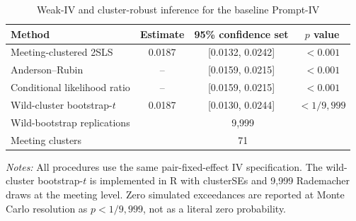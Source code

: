 \begin{table}[htbp]
\color{revisionred}
\centering
\begin{threeparttable}
\caption{Weak-IV and cluster-robust inference for the baseline Prompt-IV}
\label{tab:inference-completion}
\begin{footnotesize}
\begin{tabular}{lccc}
\toprule
Method & Estimate & 95\% confidence set & $p$ value \\
\midrule
Meeting-clustered 2SLS & 0.0187 & [0.0132, 0.0242] & $<0.001$ \\
Anderson--Rubin & -- & [0.0159, 0.0215] & $<0.001$ \\
Conditional likelihood ratio & -- & [0.0159, 0.0215] & $<0.001$ \\
Wild-cluster bootstrap-$t$ & 0.0187 & [0.0130, 0.0244] & $<1/9{,}999$ \\
\midrule
Wild-bootstrap replications & \multicolumn{3}{c}{9,999} \\
Meeting clusters & \multicolumn{3}{c}{71} \\
\bottomrule
\end{tabular}
\begin{tablenotes}[flushleft]
\scriptsize
\item \textit{Notes:} All procedures use the same pair-fixed-effect IV specification. The wild-cluster bootstrap-$t$ is implemented in R with clusterSEs and 9,999 Rademacher draws at the meeting level. Zero simulated exceedances are reported at Monte Carlo resolution as $p<1/9{,}999$, not as a literal zero probability.
\end{tablenotes}
\end{footnotesize}
\end{threeparttable}
\end{table}
